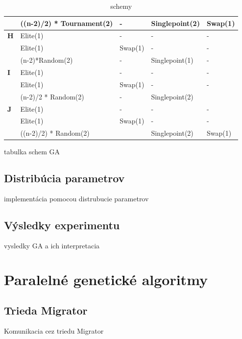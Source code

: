 \begin{table}[!h]
\begin{tabular}{@{}lllll@{}}
                & ((n-2)/2) * Tournament(2) & -                & Singlepoint(2)    & Swap(1)              \\ \midrule
\textbf{H}      & Elite(1)                  & -                & -                 & -                    \\
                & Elite(1)                  & Swap(1)          & -                 & -                    \\
                & (n-2)*Random(2)           & -                & Singlepoint(1)    & -                    \\ \midrule
\textbf{I}      & Elite(1)                  & -                & -                 & -                    \\
                & Elite(1)                  & Swap(1)          & -                 & -                    \\
                & (n-2)/2 * Random(2)       & -                & Singlepoint(2)    &                      \\ \midrule
\textbf{J}      & Elite(1)                  & -                & -                 & -                    \\
                & Elite(1)                  & Swap(1)          & -                 & -                    \\
                & ((n-2)/2) * Random(2)     &                  & Singlepoint(2)    & Swap(1)              \\ \bottomrule
\end{tabular}
\caption{schemy}
\label{tab:schemy}
\end{table}

tabulka schem GA
\subsection{Distribúcia parametrov}
implementácia pomocou distrubucie parametrov
\subsection{Výsledky experimentu}
vysledky GA a ich interpretacia

\section{Paralelné genetické algoritmy}
\subsection{Trieda Migrator}
Komunikacia cez triedu Migrator
